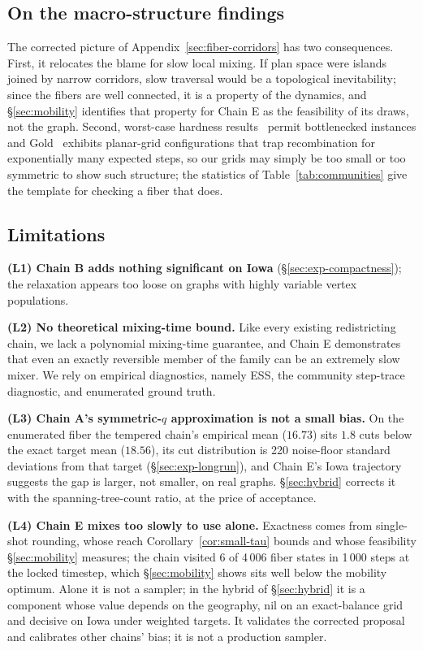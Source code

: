 \documentclass[11pt]{article}
\begin{document}
\subsection{On the macro-structure findings}\label{sec:disc-throats}

The corrected picture of Appendix~\ref{sec:fiber-corridors} has two
consequences. First, it relocates the blame for slow local mixing. If
plan space were islands joined by narrow corridors, slow traversal
would be a topological inevitability; since the fibers are well
connected, it is a property of the dynamics, and \S\ref{sec:mobility}
identifies that property for Chain E as the feasibility of its draws,
not the graph. Second, worst-case hardness
results~\cite{akitaya2022reconfiguration,charikar2023complexity}
permit bottlenecked instances and Gold~\cite{gold2026adversarial}
exhibits planar-grid configurations that trap recombination for
exponentially many expected steps, so our grids may simply be too
small or too symmetric to show such structure; the statistics of
Table~\ref{tab:communities} give the template for checking a fiber
that does.

\subsection{Limitations}\label{sec:disc-limits}

\textbf{(L1) Chain B adds nothing significant on Iowa}
(\S\ref{sec:exp-compactness}); the relaxation appears too loose on
graphs with highly variable vertex populations.

\textbf{(L2) No theoretical mixing-time bound.} Like every existing
redistricting chain, we lack a polynomial mixing-time guarantee, and
Chain E demonstrates that even an exactly reversible member of the
family can be an extremely slow mixer. We rely on empirical
diagnostics, namely ESS, the community step-trace diagnostic, and enumerated
ground truth.

\textbf{(L3) Chain A's symmetric-$q$ approximation is not a small
bias.} On the enumerated fiber the tempered chain's empirical mean
($16.73$) sits $1.8$ cuts below the exact target mean ($18.56$), its
cut distribution is 220 noise-floor standard deviations from that
target (\S\ref{sec:exp-longrun}), and
Chain E's Iowa trajectory suggests the gap is larger, not smaller, on
real graphs. \S\ref{sec:hybrid} corrects it with the
spanning-tree-count ratio, at the price of acceptance.

\textbf{(L4) Chain E mixes too slowly to use alone.} Exactness comes
from single-shot rounding, whose reach Corollary~\ref{cor:small-tau}
bounds and whose feasibility \S\ref{sec:mobility} measures; the chain
visited 6 of 4\,006 fiber states in 1\,000 steps at the locked
timestep, which \S\ref{sec:mobility} shows sits well below the
mobility optimum. Alone it is not a sampler; in the hybrid of
\S\ref{sec:hybrid} it is a component whose value depends on the
geography, nil on an exact-balance grid and decisive on Iowa under
weighted targets. It validates the corrected
proposal and calibrates other chains' bias; it is not a production
sampler.
\end{document}
